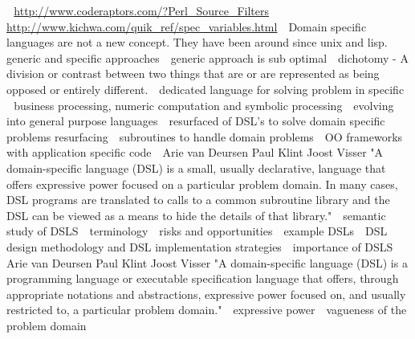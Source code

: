 \newline 
\url{http://www.coderaptors.com/?Perl_Source_Filters}
\newline 
\url{http://www.kichwa.com/quik_ref/spec_variables.html}
\newline 
Domain specific languages are not a new concept.  They have been around since unix and lisp.
\newline 
generic and specific approaches
\newline 
generic approach is sub optimal
\newline 
dichotomy - A division or contrast between two things that are or are represented as being opposed or entirely different.
\newline 
dedicated language for solving problem in specific 
\newline 
business processing, numeric computation and symbolic processing
\newline 
evolving into general purpose languages
\newline 
resurfaced of DSL's to solve domain specific problems resurfacing
\newline 
subroutines to handle domain problems
\newline 
OO frameworks with application specific code
\newline 
Arie van Deursen Paul Klint Joost Visser 
"A domain-specific language (DSL) is a small, usually
declarative, language that offers expressive power focused
on a particular problem domain. In many cases,
DSL programs are translated to calls to a common subroutine
library and the DSL can be viewed as a means to
hide the details of that library."
\newline 
semantic study of DSLS
\newline 
terminology
\newline 
risks and opportunities
\newline 
example DSLs
\newline 
DSL design methodology and DSL implementation strategies
\newline 
importance of DSLS
\newline 
Arie van Deursen Paul Klint Joost Visser 
"A domain-specific language (DSL) is a programming
language or executable specification language
that offers, through appropriate notations and abstractions,
expressive power focused on, and usually
restricted to, a particular problem domain."
\newline 
expressive power
\newline 
vagueness of the problem domain
